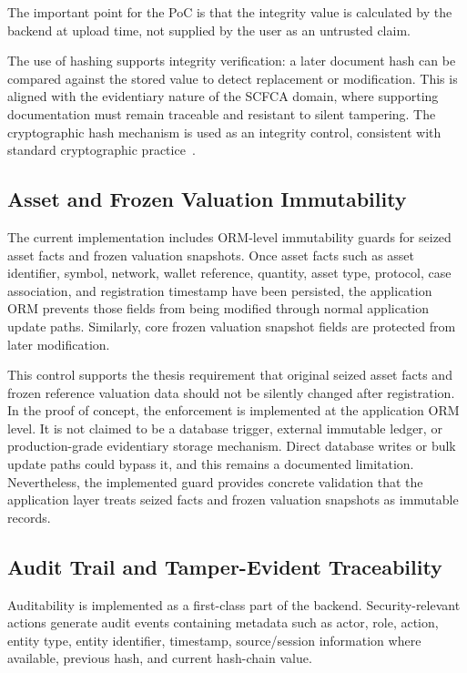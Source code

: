 \documentclass[12pt,a4paper]{report}
\begin{document}
The important point for the PoC is that the integrity value is calculated by the backend at upload time, not supplied by the user as an untrusted claim.

The use of hashing supports integrity verification: a later document hash can be compared against the stored value to detect replacement or modification. This is aligned with the evidentiary nature of the SCFCA domain, where supporting documentation must remain traceable and resistant to silent tampering. The cryptographic hash mechanism is used as an integrity control, consistent with standard cryptographic practice~\cite{Aumasson2021}.

\subsection{Asset and Frozen Valuation Immutability}

The current implementation includes ORM-level immutability guards for seized asset facts and frozen valuation snapshots. Once asset facts such as asset identifier, symbol, network, wallet reference, quantity, asset type, protocol, case association, and registration timestamp have been persisted, the application ORM prevents those fields from being modified through normal application update paths. Similarly, core frozen valuation snapshot fields are protected from later modification.

This control supports the thesis requirement that original seized asset facts and frozen reference valuation data should not be silently changed after registration. In the proof of concept, the enforcement is implemented at the application ORM level. It is not claimed to be a database trigger, external immutable ledger, or production-grade evidentiary storage mechanism. Direct database writes or bulk update paths could bypass it, and this remains a documented limitation. Nevertheless, the implemented guard provides concrete validation that the application layer treats seized facts and frozen valuation snapshots as immutable records.

\subsection{Audit Trail and Tamper-Evident Traceability}

Auditability is implemented as a first-class part of the backend. Security-relevant
actions generate audit events containing metadata such as actor, role, action, entity
type, entity identifier, timestamp, source/session information where available, previous
hash, and current hash-chain value.
\end{document}
